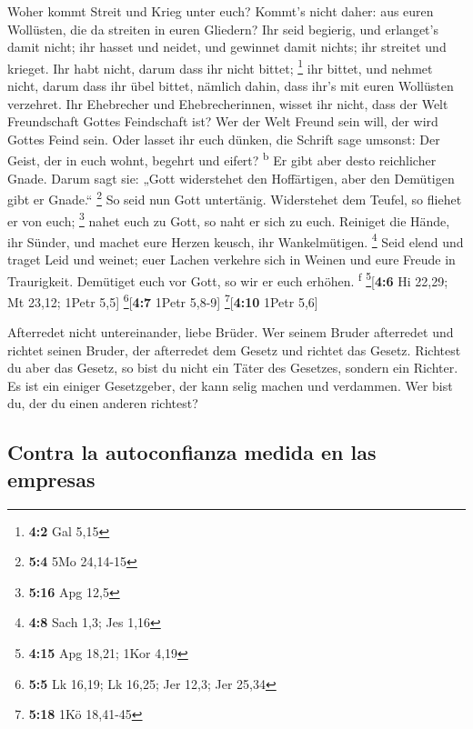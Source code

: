  Woher kommt Streit und Krieg unter euch? Kommt's nicht
daher: aus euren Wollüsten, die da streiten in euren Gliedern?
 Ihr seid begierig, und erlanget's damit nicht; ihr hasset
und neidet, und gewinnet damit nichts; ihr streitet und krieget. Ihr
habt nicht, darum dass ihr nicht bittet; \footnote{\textbf{4:2} Gal 5,15}
 ihr bittet, und nehmet nicht, darum dass ihr übel bittet,
nämlich dahin, dass ihr's mit euren Wollüsten verzehret. 
Ihr Ehebrecher und Ehebrecherinnen, wisset ihr nicht, dass der Welt
Freundschaft Gottes Feindschaft ist? Wer der Welt Freund sein will, der
wird Gottes Feind sein.  Oder lasset ihr euch dünken, die
Schrift sage umsonst: Der Geist, der in euch wohnt, begehrt und eifert?
\textsuperscript{b}  Er gibt aber desto reichlicher Gnade.
Darum sagt sie: „Gott widerstehet den Hoffärtigen, aber den Demütigen
gibt er Gnade.`` \footnote{\textbf{5:4} 5Mo 24,14-15}  So
seid nun Gott untertänig. Widerstehet dem Teufel, so fliehet er von
euch; \footnote{\textbf{5:16} Apg 12,5}  nahet euch zu
Gott, so naht er sich zu euch. Reiniget die Hände, ihr Sünder, und
machet eure Herzen keusch, ihr Wankelmütigen. \footnote{\textbf{4:8}
  Sach 1,3; Jes 1,16}  Seid elend und traget Leid und
weinet; euer Lachen verkehre sich in Weinen und eure Freude in
Traurigkeit.  Demütiget euch vor Gott, so wir er euch
erhöhen. \textsuperscript{f} \footnote{\textbf{4:15} Apg 18,21; 1Kor
  4,19}{[}\textbf{4:6} Hi 22,29; Mt 23,12; 1Petr 5,5{]}
\footnote{\textbf{5:5} Lk 16,19; Lk 16,25; Jer 12,3; Jer 25,34}{[}\textbf{4:7}
1Petr 5,8-9{]} \footnote{\textbf{5:18} 1Kö 18,41-45}{[}\textbf{4:10}
1Petr 5,6{]}

 Afterredet nicht untereinander, liebe Brüder. Wer seinem
Bruder afterredet und richtet seinen Bruder, der afterredet dem Gesetz
und richtet das Gesetz. Richtest du aber das Gesetz, so bist du nicht
ein Täter des Gesetzes, sondern ein Richter.  Es ist ein
einiger Gesetzgeber, der kann selig machen und verdammen. Wer bist du,
der du einen anderen richtest?

\hypertarget{contra-la-autoconfianza-medida-en-las-empresas}{%
\subsection{Contra la autoconfianza medida en las
empresas}\label{contra-la-autoconfianza-medida-en-las-empresas}}


